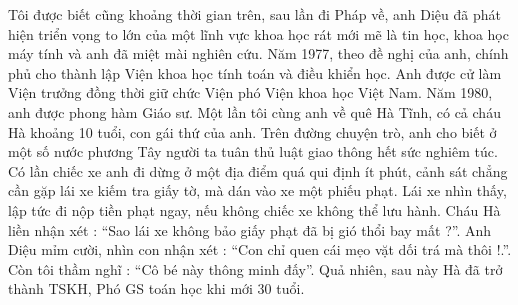  Tôi được biết cũng khoảng thời gian trên, sau lần đi Pháp về, anh Diệu đã phát hiện triển vọng to lớn của một lĩnh vực khoa học rát mới mẽ là tin học, khoa học máy tính và anh đã miệt mài nghiên cứu. Năm 1977, theo đề nghị của anh, chính phủ cho thành lập Viện khoa học tính toán và điều khiển học. Anh được cử làm Viện trưởng đồng thời giữ chức Viện phó Viện khoa học Việt Nam. Năm 1980, anh được phong hàm Giáo sư. Một lần tôi cùng anh về quê Hà Tĩnh, có cả cháu Hà khoảng 10 tuổi, con gái thứ của anh. Trên đường chuyện trò, anh cho biết ở một số nước phương Tây người ta tuân thủ luật giao thông hết sức nghiêm túc. Có lần chiếc xe anh đi dừng ở một địa điểm quá qui định ít phút, cảnh sát chẳng cần gặp lái xe kiếm tra giấy tờ, mà dán vào xe một phiếu phạt. Lái xe nhìn thấy, lập tức đi nộp tiền phạt ngay, nếu không chiếc xe không thể lưu hành. Cháu Hà liền nhận xét : “Sao lái xe không bảo giấy phạt đã bị gió thổi bay mất ?”. Anh Diệu mỉm cười, nhìn con nhận xét : “Con chỉ quen cái mẹo vặt dối trá mà thôi !.”. Còn tôi thầm nghĩ : “Cô bé này thông minh đấy”. Quả nhiên, sau này Hà đã trở thành TSKH, Phó GS toán học khi mới 30 tuổi.

